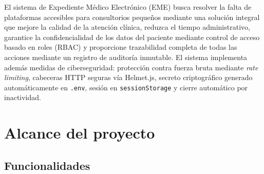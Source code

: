 \documentclass[11pt,a4paper]{article}
\begin{document}
El sistema de Expediente Médico Electrónico (EME) busca resolver la falta de plataformas accesibles para consultorios pequeños mediante una solución integral que mejore la calidad de la atención clínica, reduzca el tiempo administrativo, garantice la confidencialidad de los datos del paciente mediante control de acceso basado en roles (RBAC) y proporcione trazabilidad completa de todas las acciones mediante un registro de auditoría inmutable. El sistema implementa además medidas de ciberseguridad: protección contra fuerza bruta mediante \textit{rate limiting}, cabeceras HTTP seguras vía Helmet.js, secreto criptográfico generado automáticamente en \texttt{.env}, sesión en \texttt{sessionStorage} y cierre automático por inactividad.

\section{Alcance del proyecto}

\subsection{Funcionalidades}
\end{document}

